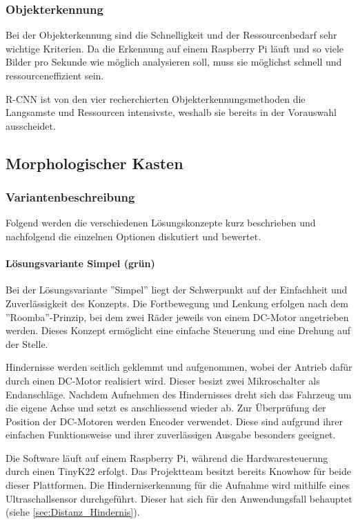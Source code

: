 \documentclass[../main.tex]{subfiles}
\begin{document}
\subsubsection{Objekterkennung}

Bei der Objekterkennung sind die Schnelligkeit und der Ressourcenbedarf sehr wichtige Kriterien.
Da die Erkennung auf einem Raspberry Pi läuft und so viele Bilder pro Sekunde wie möglich analysieren soll, muss sie möglichst schnell und ressourceneffizient sein. 

R-CNN ist von den vier recherchierten Objekterkennungsmethoden die Langsamste und Ressourcen intensivste, weshalb sie bereits in der Vorauswahl ausscheidet.


\subsection{Morphologischer Kasten}\label{morphologischer kasten}

    

    \subsubsection{Variantenbeschreibung}
    Folgend werden die verschiedenen Lösungskonzepte kurz beschrieben und nachfolgend die einzelnen Optionen diskutiert und bewertet.
    \paragraph{Lösungsvariante Simpel (grün)} 
    \label{a3:loesungsvariante_Simpel}
    Bei der Lösungsvariante ''Simpel'' liegt der Schwerpunkt auf der Einfachheit und Zuverlässigkeit des Konzepts. Die Fortbewegung und Lenkung erfolgen nach dem ''Roomba''-Prinzip, bei dem zwei Räder jeweils von einem DC-Motor angetrieben werden. Dieses Konzept ermöglicht eine einfache Steuerung und eine Drehung auf der Stelle.

    Hindernisse werden seitlich geklemmt und aufgenommen, wobei der Antrieb dafür durch einen DC-Motor realisiert wird. Dieser besizt zwei Mikroschalter als Endanschläge. Nachdem Aufnehmen des Hindernisses dreht sich das Fahrzeug um die eigene Achse und setzt es anschliessend wieder ab. Zur Überprüfung der Position der DC-Motoren werden Encoder verwendet. Diese sind aufgrund ihrer einfachen Funktionsweise und ihrer zuverlässigen Ausgabe besonders geeignet.

    Die Software läuft auf einem Raspberry Pi, während die Hardwaresteuerung durch einen TinyK22 erfolgt. Das Projektteam besitzt bereits Knowhow für beide dieser Plattformen. Die Hinderniserkennung für die Aufnahme wird mithilfe eines Ultraschallsensor durchgeführt. Dieser hat sich für den Anwendungsfall behauptet (siehe \ref{sec:Distanz_Hindernis}). 
\end{document}
